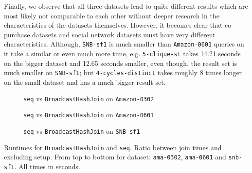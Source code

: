 Finally, we observe that all three datasets lead to quite different results which are most likely not comparable to each other without deeper research
in the characteristics of the datasets themselves.
However, it becomes clear that co-purchase datasets and social network datasets must have very different characteristics.
Although, \texttt{SNB-sf1} is much smaller than \texttt{Amazon-0601} queries on it take a similar or even much more time,
e.g. \texttt{5-clique-st} takes 14.21 seconds on the bigger dataset and 12.65 seconds smaller, even though, the result set is much smaller on \texttt{SNB-sf1};
but \texttt{4-cycles-distinct} takes roughly 8 times longer on the small dataset and has a much bigger result set.
\begin{figure}
    \centering
    
    \caption{\texttt{seq} vs \texttt{BroadcastHashJoin} on \texttt{Amazon-0302}}
    \label{fig:seq-bar-ama-0302}
\end{figure}

\begin{figure}
    \centering
    
    \caption{\texttt{seq} vs \texttt{BroadcastHashJoin} on \texttt{Amazon-0601}}
    \label{fig:seq-bar-ama-0601}
\end{figure}

\begin{figure}
    \centering
    
    \caption{\texttt{seq} vs \texttt{BroadcastHashJoin} on \texttt{SNB-sf1}}
    \label{fig:seq-bar-snb-sf1}
\end{figure}

\begin{table}
    \centering

    
    \vspace{0.3cm}

    

    \vspace{0.3cm}
    
    \caption{Runtimes for \texttt{BroadcastHashJoin} and \texttt{seq}.
        Ratio between join times and excluding setup.
        From top to bottom for dataset: \texttt{ama-0302}, \texttt{ama-0601} and \texttt{snb-sf1}.
        All times in seconds.
    }
    \label{table:seq-vs-bhj}
\end{table}




